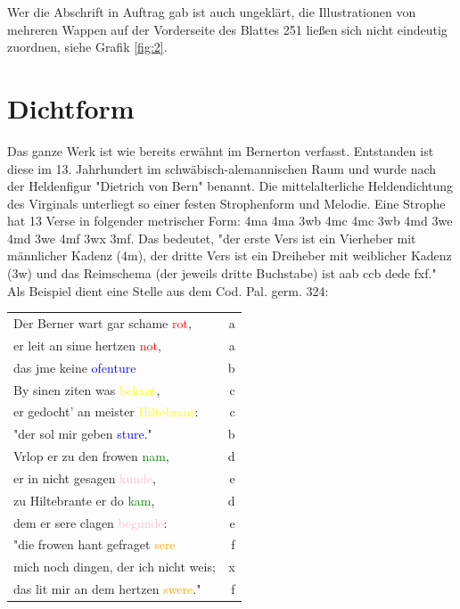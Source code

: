 \documentclass[a4paper, 12pt, oneside]{scrbook}
\begin{document}
Wer die Abschrift in Auftrag gab ist auch ungeklärt, die Illustrationen von mehreren Wappen auf der Vorderseite des Blattes 251 ließen sich nicht eindeutig zuordnen, siehe Grafik \ref*{fig:2}.\cite{ubheidelber_bibpal}
\newpage

\section{Dichtform}
Das ganze Werk ist wie bereits erwähnt im Bernerton verfasst. Entstanden ist diese im 13. Jahrhundert im schwäbisch-alemannischen Raum und wurde nach der Heldenfigur "Dietrich von Bern" benannt. Die mittelalterliche Heldendichtung des Virginals unterliegt so einer festen Strophenform und Melodie. Eine Strophe hat 13 Verse in folgender metrischer Form: 4ma 4ma 3wb 4mc 4mc 3wb 4md 3we 4md 3we 4mf 3wx 3mf. Das bedeutet, "der erste Vers ist ein Vierheber mit männlicher Kadenz (4m), der dritte Vers ist ein Dreiheber mit weiblicher Kadenz (3w) und das Reimschema (der jeweils dritte Buchstabe) ist aab ccb dede fxf."\cite{wiki_bernerton} Als Beispiel dient eine Stelle aus dem Cod. Pal. germ. 324:\\

\begin{tabular}{lr}
Der Berner wart gar schame \textcolor{red}{rot}, & a \\
er leit an sime hertzen \textcolor{red}{not}, & a \\
das jme keine \textcolor{blue}{ofenture} & b \\
By sinen ziten was \textcolor{yellow}{bekant}, & c \\
er gedocht' an meister \textcolor{yellow}{Hiltebrant}: & c \\
"der sol mir geben \textcolor{blue}{sture}." & b \\
Vrlop er zu den frowen \textcolor{green}{nam}, & d \\
er in nicht gesagen \textcolor{pink}{kunde}, & e \\
zu Hiltebrante er do \textcolor{green}{kam}, & d \\
dem er sere clagen \textcolor{pink}{begunde}: & e \\
"die frowen hant gefraget \textcolor{orange}{sere} & f \\
mich noch dingen, der ich nicht weis; & x \\
das lit mir an dem hertzen \textcolor{orange}{swere}." & f \\
\end{tabular}\cite{ubh_bernerton}\\
\end{document}
